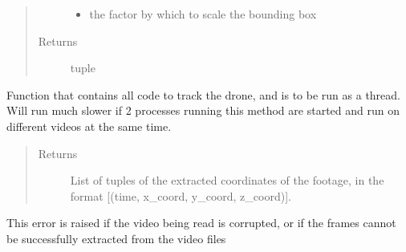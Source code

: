 \documentclass[letterpaper,10pt,english]{sphinxmanual}
\begin{document}
\begin{fulllineitems}
\begin{fulllineitems}
\begin{quote}
\begin{description}
\begin{itemize}
\item {} 
 \textendash{} the factor by which to scale the bounding box

\end{itemize}

\item[{Returns}] \leavevmode
tuple

\end{description}\end{quote}

\end{fulllineitems}


\begin{fulllineitems}
\label{\detokenize{index:src.Controllers.OpenCVThreadedController.DroneTracker.trackDrone}}
Function that contains all code to track the drone, and is to be run
as a thread. Will run much slower if 2 processes running this method are started and run on different
videos at the same time.
\begin{quote}\begin{description}
\item[{Returns}] \leavevmode
List of tuples of the extracted coordinates of the footage, in the format {[}(time, x\_coord, y\_coord, z\_coord){]}.

\end{description}\end{quote}

\end{fulllineitems}


\end{fulllineitems}


\begin{fulllineitems}
\label{\detokenize{index:src.Controllers.OpenCVThreadedController.VideoCorruptedException}}
This error is raised if the video being read is corrupted, or if the frames cannot be
successfully extracted from the video files

\end{fulllineitems}
\end{document}
